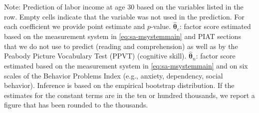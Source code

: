 \documentclass[static]{JJH-Beamer}
\begin{document}
\begin{frame}
\begin{table}[H]
\begin{center}
{}
\end{center}
\tiny \flushleft
Note: Prediction of labor income at age 30 based on the variables listed in the row. Empty cells indicate that the variable was not used in the prediction. For each coefficient we provide point estimate and $p$-value. $\hat{\bm{\theta}}_{c}$: factor score estimated based on the measurement system in \eqref{eq:sa-msystemmain} and PIAT sections that we do not use to predict (reading and comprehension) as well as by the Peabody Picture Vocabulary Test (PPVT) (cognitive skill). $\hat{\bm{\theta}}_{n}$: factor score estimated based on the measurement system in \eqref{eq:sa-msystemmain} and on six scales of the Behavior Problems Index (e.g., anxiety, dependency, social behavior). Inference is based on the empirical bootstrap distribution. If the estimates for the constant terms are in the ten or hundred thousands, we report a figure that has been rounded to the thousands.\\
\end{table}

\end{frame}
\end{document}
